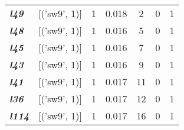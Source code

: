 \begin{table}
\begin{tabular}{llccccc}
    \textbf{\textit{l49}}                                                                        & {[}('sw9', 1)]                       & 1             & 0.018          & 2              & 0              & 1                                 \\
    \textbf{\textit{l48}}                                                                        & {[}('sw9', 1)]                       & 1             & 0.016          & 5              & 0              & 1                                 \\
    \textbf{\textit{l45}}                                                                        & {[}('sw9', 1)]                       & 1             & 0.016          & 7              & 0              & 1                                 \\
    \textbf{\textit{l43}}                                                                        & {[}('sw9', 1)]                       & 1             & 0.016          & 9              & 0              & 1                                 \\
    \textbf{\textit{l41}}                                                                        & {[}('sw9', 1)]                       & 1             & 0.017          & 11             & 0              & 1                                 \\
    \textbf{\textit{l36}}                                                                        & {[}('sw9', 1)]                       & 1             & 0.017          & 12             & 0              & 1                                 \\
    \textbf{\textit{l114}}                                                                       & {[}('sw9', 1)]                       & 1             & 0.017          & 16             & 0              & 1                                 \\
    \hline
    \end{tabular}
    \end{table}
